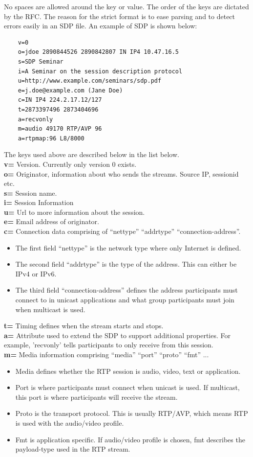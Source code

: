 No spaces are allowed around the key or value.
The order of the keys are dictated by the RFC. The reason for the strict format is to ease parsing and to detect errors easily in an SDP file. An example of SDP is shown below:

\begin{verbatim}
    v=0
    o=jdoe 2890844526 2890842807 IN IP4 10.47.16.5
    s=SDP Seminar
    i=A Seminar on the session description protocol
    u=http://www.example.com/seminars/sdp.pdf
    e=j.doe@example.com (Jane Doe)
    c=IN IP4 224.2.17.12/127
    t=2873397496 2873404696
    a=recvonly
    m=audio 49170 RTP/AVP 96
    a=rtpmap:96 L8/8000
\end{verbatim}
The keys used above are described below in the list below. \\
\textbf{v=} Version. Currently only version 0 exists. \\
\textbf{o=} Originator, information about who sends the streams. Source IP, sessionid etc. \\
\textbf{s=} Session name. \\
\textbf{i=} Session Information \\
\textbf{u=} Url to more information about the session.\\
\textbf{e=} Email address of originator.\\
\textbf{c=} Connection data comprising of ``nettype'' ``addrtype'' ``connection-address''.
\begin{itemize}
	\item The first field ``nettype'' is the network type where only Internet is defined. 
	\item The second field ``addrtype'' is the type of the address. This can either be IPv4 or IPv6.
	\item The third field ``connection-address'' defines the address participants must connect to in unicast applications and what group participants must join when multicast is used.
\end{itemize}
\textbf{t=} Timing defines when the stream starts and stops. \\
\textbf{a=} Attribute used to extend the SDP to support additional properties. For example, 'recvonly' tells participants to only receive from this session. \\
\textbf{m=} Media information comprising ``media'' ``port'' ``proto'' ``fmt'' ...
\begin{itemize}
	\item Media defines whether the RTP session is audio, video, text or application.
	\item Port is where participants must connect when unicast is used. If multicast, this port is where participants will receive the stream.
	\item Proto is the transport protocol. This is usually RTP/AVP, which means RTP is used with the audio/video profile.
	\item Fmt is application specific. If audio/video profile is chosen, fmt describes the payload-type used in the RTP stream.
\end{itemize}
